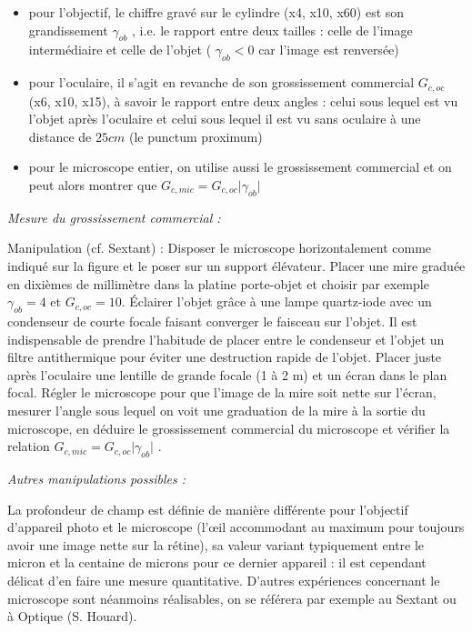 \documentclass{article}%
\begin{document}
\begin{itemize}
	\item pour l'objectif, le chiffre gravé sur le cylindre (x4, x10, x60) est son grandissement $\gamma_{ob}$ , i.e. le rapport entre deux tailles : celle de l'image intermédiaire et celle de l'objet ( $\gamma_{ob} <0$ car l'image est renversée)

	\item pour l'oculaire, il s'agit en revanche de son grossissement commercial $G_{c,oc}$ (x6, x10, x15), à savoir le rapport entre deux angles : celui sous lequel est vu l'objet après l'oculaire et celui sous lequel il est vu sans oculaire à une distance de $25 cm$ (le punctum proximum)

	\item pour le microscope entier, on utilise aussi le grossissement commercial et on peut alors montrer que $G_{c,mic}=G_{c,oc} \vert \gamma_{ob} \vert$
\end{itemize}

\textit{Mesure du grossissement commercial :}

Manipulation (cf. Sextant) : Disposer le microscope horizontalement comme indiqué sur la figure et le poser sur un support élévateur. Placer une mire graduée en dixièmes de millimètre dans la platine porte-objet et choisir par exemple $\gamma_{ob}=4$ et $G_{c,oc} = 10$. Éclairer l'objet grâce à une lampe quartz-iode avec un condenseur de courte focale faisant converger le faisceau sur l'objet. Il est indispensable de prendre l'habitude de placer entre le condenseur et l'objet un filtre antithermique pour éviter une destruction rapide de l'objet. Placer juste après l'oculaire une lentille de grande focale (1 à 2 m) et un écran dans le plan focal. Régler le microscope pour que l'image de la mire soit nette sur l'écran, mesurer l'angle sous lequel on voit une graduation de la mire à la sortie du microscope, en déduire le grossissement commercial du microscope et vérifier la relation $G_{c,mic}=G_{c,oc} \vert \gamma_{ob} \vert$ .

\textit{Autres manipulations possibles :}

La profondeur de champ est définie de manière différente pour l'objectif d'appareil photo et le microscope (l’œil accommodant au maximum pour toujours avoir une image nette sur la rétine), sa valeur variant typiquement entre le micron et la centaine de microns pour ce dernier appareil : il est cependant délicat d'en faire une mesure quantitative. D'autres expériences concernant le microscope sont néanmoins réalisables, on se référera par exemple au Sextant ou à Optique (S. Houard). 
\end{document}
